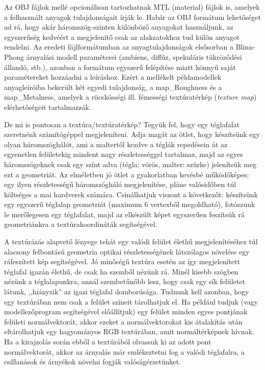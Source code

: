 Az OBJ fájlok mellé opcionálisan tartozhatnak MTL (material) fájlok is, amelyek a felhasznált anyagok tulajdonságait írják le. Habár az OBJ formátum lehetőséget ad rá, hogy akár háromszög-szinten különböző anyagokat használjunk, az egyszerűség kedvéért a megjelenítő csak az alakzatokhoz tud külön anyagot rendelni. Az eredeti fájlformátumban az anyagtulajdonságok elsősorban a Blinn-Phong árnyalási modell paraméterei (ambiens, diffúz, spekuláris tükröződési állandó, stb.), azonban a formátum egyszerű felépítése miatt könnyű saját paramétereket hozzáadni a leíráshoz. Ezért a mellékelt példamodellek anyagleíróiba bekerült két egyedi tulajdonság, a map\_Roughness és a map\_Metalness, amelyek a rücskösségi ill. fémességi textúratérkép (\textit{texture map}) elérhetőségeit tartalmazzák.

De mi is pontosan a textúra/textúratérkép? Tegyük fel, hogy egy téglafalat szeretnénk számítógéppel megjeleníteni. Adja magát az ötlet, hogy készítsünk egy olyan háromszöghálót, ami a maltertől kezdve a téglák repedésein át az egyenetlen felületekig mindent nagy részletességgel tartalmaz, majd az egyes háromszögeknek csak egy színt adva (tégla: vörös, malter: szürke) jelenítsük meg ezt a geometriát. Az elméletben jó ötlet a gyakorlatban kevésbé működőképes: egy ilyen részletességű háromszögháló megjelenítése, pláne valósidőben túl költséges a mai hardverek számára. Csinálhatjuk viszont a következőt: készítsünk egy egyszerű téglalap geometriát (maximum 6 vertexből megoldható), fotózzunk le merőlegesen egy téglafalat, majd az elkészült képet egyszerűen feszítsük rá geometriánkra a textúrakoordináták segítségével.

A textúrázás alapvető lényege tehát egy valódi felület élethű megjelenítéséhez túl alacsony felbontású geometria optikai részletességének látszólagos növelése egy ráfeszített kép segítségével. Jó minőségű textúra esetén az így megjelenített téglafal igazán élethű, de csak ha szemből nézünk rá. Minél kisebb szögben nézünk a téglalapunkra, annál szembetűnőbb lesz, hogy csak egy sík felületet látunk, ,,hiányzik'' az igazi téglafal domborúsága. Tudnunk kell azonban, hogy egy textúrában nem csak a felület színeit tárolhatjuk el. Ha például tudjuk (vagy modellezőprogram segítségével előállítjuk) egy felület minden egyes pontjának felületi normálvektorát, akkor ezeket a normálvektorokat kis átalakítás után eltárolhatjuk egy hagyományos RGB textúrában, amit normáltérképnek hívnak. Ha a kirajzolás során ebből a textúrából olvassuk ki az adott pont normálvektorát, akkor az árnyalás már emlékeztetni fog a valódi téglafalra, a csillanások és árnyékok növelni fogják valóságérzetünket.

